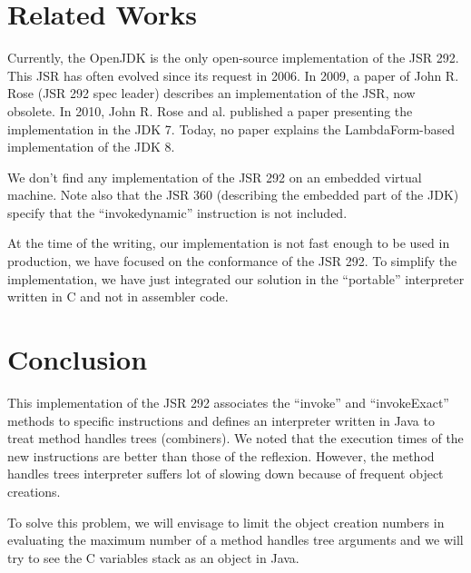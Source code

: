\documentclass{sig-alternate}
\def \Jsr{JSR\xspace}
\def \JSR{\Jsr 292\xspace}
\begin{document}
\section{Related Works}

  Currently, the OpenJDK is the only open-source implementation of the \JSR.
  This JSR has often evolved since its request in 2006\cite{jcp-jsr-292}.
  In 2009, a paper of John R. Rose (\JSR spec leader) describes an implementation of the \Jsr, now obsolete\cite{vmil-rose-indy-2009}.
  In 2010, John R. Rose and al. published a paper presenting the implementation in the JDK 7\cite{pppj-rose-indy-2010}.
  Today, no paper explains the LambdaForm-based implementation of the JDK 8.

  We don't find any implementation of the \JSR on an embedded virtual machine.
  Note also that the \Jsr 360 (describing the embedded part of the JDK) specify that the ``invokedynamic'' instruction is not included\cite{jcp-jsr-360}.



  At the time of the writing, our implementation is not fast enough to be used in production, we have focused on the conformance of the \JSR.
  To simplify the implementation, we have just integrated our solution in the ``portable'' interpreter written in C and not in assembler code.

\section{Conclusion}

  This implementation of the \JSR associates the ``invoke'' and ``invokeExact'' methods to specific instructions
  and defines an interpreter written in Java to treat method handles trees (combiners).
  We noted that the execution times of the new instructions are better than those of the reflexion.
  However, the method handles trees interpreter suffers lot of slowing down because of frequent object creations.
  
  To solve this problem, we will envisage to limit the object creation numbers in evaluating the maximum number of a method handles tree arguments
  and we will try to see the C variables stack as an object in Java.

\appendix


\makeatletter
  \def\@seccntformat#1{Appendix~\csname the#1\endcsname:\quad}
\makeatother

% 

\end{document}
